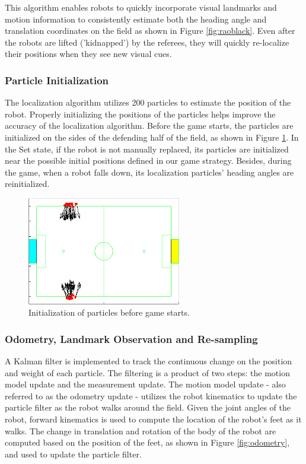 \documentclass{article}
\begin{document}
	This algorithm enables robots to quickly incorporate visual landmarks and motion information to consistently estimate both the heading angle and translation coordinates on the field as shown in Figure \ref{fig:raoblack}. Even after the robots are lifted ('kidnapped') by the referees, they will quickly re-localize their positions when they see new visual cues.	

\subsubsection{Particle Initialization}
	The localization algorithm utilizes 200 particles to estimate the position of the robot. Properly initializing the positions of the particles helps improve the accuracy of the localization algorithm. Before the game starts, the particles are initialized on the sides of the defending half of the field, as shown in Figure \ref{fig:Init}. In the Set state, if the robot is not manually replaced, its particles are initialized near the possible initial positions defined in our game strategy. Besides, during the game, when a robot falls down, its localization particles' heading angles are reinitialized.
    
	\begin{figure}[H]
		\centering
		\includegraphics[width=0.6\textwidth]{figures/InitParticles}    
		\caption{Initialization of particles before game starts.}
		\label{fig:Init}
	\end{figure}

\subsubsection{Odometry, Landmark Observation and Re-sampling}
	A Kalman filter is implemented to track the continuous change on the position and weight of each particle. The filtering is a product of two steps: the motion model update and the measurement update. The motion model update - also referred to as the odometry update - utilizes the robot kinematics to update the particle filter as the robot walks around the field. Given the joint angles of the robot, forward kinematics is used to compute the location of the robot's feet as it walks. The change in translation and rotation of the body of the robot are computed based on the position of the feet, as shown in Figure \ref{fig:odometry}, and used to update the particle filter.
\end{document}
